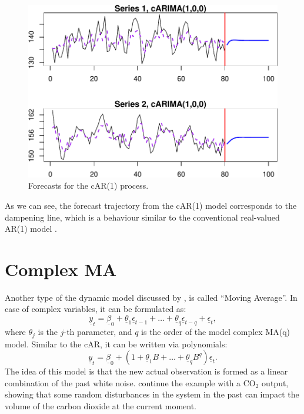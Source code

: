 \documentclass[
]{book}
\begin{document}
\begin{figure}
\centering
\includegraphics{Svetunkov---Svetunkov---Complex-Valued-Econometrics_files/figure-latex/complexAR1Forecast-1.pdf}
\caption{\label{fig:complexAR1Forecast}Forecasts for the cAR(1) process.}
\end{figure}

As we can see, the forecast trajectory from the cAR(1) model corresponds to the dampening line, which is a behaviour similar to the conventional real-valued AR(1) model \citep[e.g.~discussed in Subsection 8.1.1 of][]{SvetunkovAdam}.

\hypertarget{complex-ma}{%
\section{Complex MA}\label{complex-ma}}

Another type of the dynamic model discussed by \citet{Box1976}, is called ``Moving Average''. In case of complex variables, it can be formulated as:
\begin{equation}
    \underline{y}_t = \underline{\beta}_0 + \underline{\theta}_1 \underline{\epsilon}_{t-1} + \dots + \underline{\theta}_q \underline{\epsilon}_{t-q} + \underline{\epsilon}_t ,
    \label{eq:ComplexMA}
\end{equation}
where \(\theta_j\) is the \(j\)-th parameter, and \(q\) is the order of the model complex MA(q) model. Similar to the cAR, it can be written via polynomials:
\begin{equation}
    \underline{y}_t  = \underline{\beta}_0 + \left(1 + \underline{\theta}_1 B + \dots + \underline{\theta}_q B^q \right) \underline{\epsilon}_t .
    \label{eq:ComplexMAPolynomial}
\end{equation}
The idea of this model is that the new actual observation is formed as a linear combination of the past white noise. \citet{Box1976} continue the example with a CO\(_2\) output, showing that some random disturbances in the system in the past can impact the volume of the carbon dioxide at the current moment.
\end{document}
